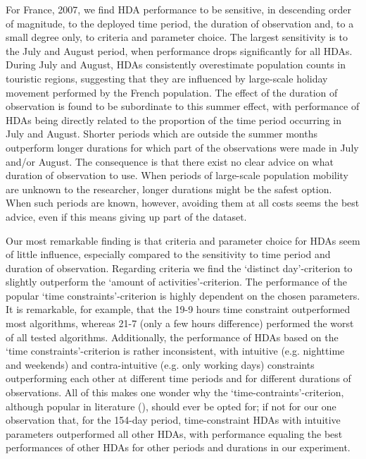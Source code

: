 \documentclass[a4paper]{article}
\begin{document}
For France, 2007, we find HDA performance to be sensitive, in descending order of magnitude, to the deployed time period, the duration of observation and, to a small degree only, to criteria and parameter choice. The largest sensitivity is to the July and August period, when performance drops significantly for all HDAs. During July and August, HDAs consistently overestimate population counts in touristic regions, suggesting that they are influenced by large-scale holiday movement performed by the French population. The effect of the duration of observation is found to be subordinate to this summer effect, with performance of HDAs being directly related to the proportion of the time period occurring in July and August. Shorter periods which are outside the summer months outperform longer durations for which part of the observations were made in July and/or August. The consequence is that there exist no clear advice on what duration of observation to use. When periods of large-scale population mobility are unknown to the researcher, longer durations might be the safest option. When such periods are known, however, avoiding them at all costs seems the best advice, even if this means giving up part of the dataset.  

Our most remarkable finding is that criteria and parameter choice for HDAs seem of little influence, especially compared to the sensitivity to time period and duration of observation. Regarding criteria we find the `distinct day'-criterion to slightly outperform the `amount of activities'-criterion. The performance of the popular `time constraints'-criterion is highly dependent on the chosen parameters. It is remarkable, for example, that the 19-9 hours time constraint outperformed most algorithms, whereas 21-7 (only a few hours difference) performed the worst of all tested algorithms. Additionally, the performance of HDAs based on the `time constraints'-criterion is rather inconsistent, with intuitive (e.g. nighttime and weekends) and contra-intuitive (e.g. only working days) constraints outperforming each other at different time periods and for different durations of observations. All of this makes one wonder why the `time-contraints'-criterion, although popular in literature (\cite{Vanhoof_JOS}), should ever be opted for; if not for our one observation that, for the 154-day period, time-constraint HDAs with intuitive parameters outperformed all other HDAs, with performance equaling the best performances of other HDAs for other periods and durations in our experiment. 
\end{document}
